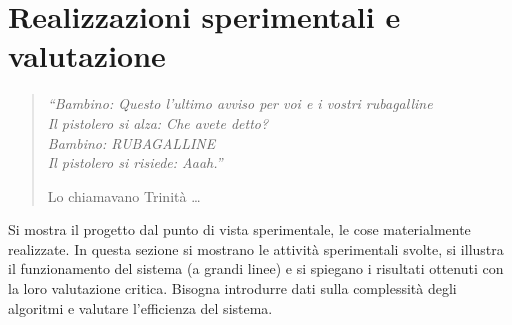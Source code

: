 \chapter{Realizzazioni sperimentali e valutazione}
\label{capitolo6}
\thispagestyle{empty}

\begin{quotation}
{\footnotesize
\noindent\emph{``Bambino: Questo  l'ultimo avviso per voi e i vostri rubagalline \\
Il pistolero si alza: Che avete detto? \\
Bambino: RUBAGALLINE \\
Il pistolero si risiede: Aaah.''}
\begin{flushright}
Lo chiamavano Trinit\`a \dots
\end{flushright}
}
\end{quotation}
\vspace{0.5cm}

\noindent Si mostra il progetto dal punto di vista sperimentale, le cose materialmente realizzate. In questa sezione si mostrano le attivit\`a sperimentali svolte, si illustra il funzionamento del sistema (a grandi linee) e si spiegano i risultati ottenuti con la loro valutazione critica. Bisogna introdurre dati sulla complessit\`a degli algoritmi e valutare l'efficienza del sistema.